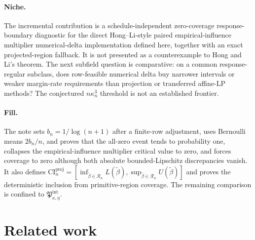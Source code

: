 \documentclass{article}
\begin{document}
\paragraph{Niche.} The incremental contribution is a schedule-independent zero-coverage response-boundary diagnostic for the direct Hong--Li-style paired empirical-influence multiplier numerical-delta implementation defined here, together with an exact projected-region fallback. It is not presented as a counterexample to Hong and Li's theorem. The next subfield question is comparative: on a common response-regular subclass, does row-feasible numerical delta buy narrower intervals or weaker margin-rate requirements than projection or transferred affine-LP methods? The conjectured \(n\kappa_n^3\) threshold is not an established frontier.

\paragraph{Fill.} The note sets \(b_n=1/\log(n+1)\) after a finite-row adjustment, uses Bernoulli means \(2b_n/n\), and proves that the all-zero event tends to probability one, collapses the empirical-influence multiplier critical value to zero, and forces coverage to zero although both absolute bounded-Lipschitz discrepancies vanish. It also defines \(\mathrm{CI}_n^{\mathrm{proj}}=[\inf_{\widetilde\beta\in\mathcal R_n}L(\widetilde\beta),\sup_{\widetilde\beta\in\mathcal R_n}U(\widetilde\beta)]\) and proves the deterministic inclusion from primitive-region coverage. The remaining comparison is confined to \(\mathfrak P_{\kappa,\eta}^{\mathrm{int}}\).

\section{Related work}
\end{document}
